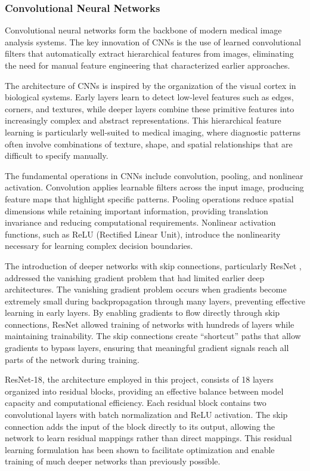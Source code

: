 \documentclass[12pt,a4paper]{article}
\begin{document}
\subsubsection{Convolutional Neural Networks}

Convolutional neural networks form the backbone of modern medical image analysis systems. The key innovation of CNNs is the use of learned convolutional filters that automatically extract hierarchical features from images, eliminating the need for manual feature engineering that characterized earlier approaches.

The architecture of CNNs is inspired by the organization of the visual cortex in biological systems. Early layers learn to detect low-level features such as edges, corners, and textures, while deeper layers combine these primitive features into increasingly complex and abstract representations. This hierarchical feature learning is particularly well-suited to medical imaging, where diagnostic patterns often involve combinations of texture, shape, and spatial relationships that are difficult to specify manually.

The fundamental operations in CNNs include convolution, pooling, and nonlinear activation. Convolution applies learnable filters across the input image, producing feature maps that highlight specific patterns. Pooling operations reduce spatial dimensions while retaining important information, providing translation invariance and reducing computational requirements. Nonlinear activation functions, such as ReLU (Rectified Linear Unit), introduce the nonlinearity necessary for learning complex decision boundaries.

The introduction of deeper networks with skip connections, particularly ResNet \cite{he2016}, addressed the vanishing gradient problem that had limited earlier deep architectures. The vanishing gradient problem occurs when gradients become extremely small during backpropagation through many layers, preventing effective learning in early layers. By enabling gradients to flow directly through skip connections, ResNet allowed training of networks with hundreds of layers while maintaining trainability. The skip connections create ``shortcut'' paths that allow gradients to bypass layers, ensuring that meaningful gradient signals reach all parts of the network during training.

ResNet-18, the architecture employed in this project, consists of 18 layers organized into residual blocks, providing an effective balance between model capacity and computational efficiency. Each residual block contains two convolutional layers with batch normalization and ReLU activation. The skip connection adds the input of the block directly to its output, allowing the network to learn residual mappings rather than direct mappings. This residual learning formulation has been shown to facilitate optimization and enable training of much deeper networks than previously possible.
\end{document}
